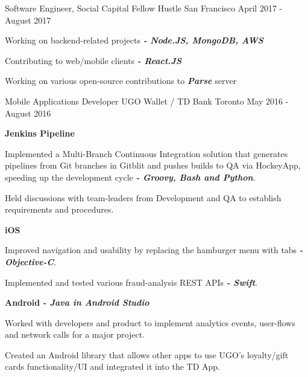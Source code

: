 \begin{cventries}
	\cventry
	{Software Engineer, Social Capital Fellow}
	{Hustle}
	{San Francisco}
	{April 2017 - August 2017}
	{
		\begin{cvitems}
			\item {Working on backend-related projects \textbf{\textit{ - Node.JS, MongoDB, AWS}}}
			\item {Contributing to web/mobile clients \textbf{\textit{  - React.JS}}}
			\item {Working on various open-source contributions to \textbf{\textit{Parse}} server}
		\end{cvitems}
	}
  \cventry
    {Mobile Applications Developer}
    {UGO Wallet / TD Bank}
    {Toronto}
    {May 2016 - August 2016}
    {
      \begin{cvitems}
        \item[]{\vspace{0.08cm}\textbf {Jenkins Pipeline}}
        \item {\vspace{0.08cm}Implemented a Multi-Branch Continuous Integration solution that generates pipelines from Git branches in Gitblit and pushes builds to QA via HockeyApp, speeding up the development cycle \textbf{\textit{ - Groovy, Bash and Python}}.}
        \item {Held discussions with team-leaders from Development and QA to establish requirements and procedures.\vspace{0.08cm}}
        \item[]{\textbf {iOS}}
        \item {\vspace{0.08cm}Improved navigation and usability by replacing the hamburger menu with tabs \textit{\textbf{ - Objective-C}}.}
        \item {Implemented and tested various fraud-analysis REST APIs \textit{\textbf{ - Swift}}.\vspace{0.08cm}}
        \item[]{\textbf {Android} \textit{\textbf { - Java in Android Studio}}}
        \item {\vspace{0.08cm}Worked with developers and product to implement analytics events, user-flows and network calls for a major project.\vspace{0.00cm}}
        \item {Created an Android library that allows other apps to use UGO's loyalty/gift cards functionality/UI and integrated it into the TD App.}

\end{cvitems}}
\end{cventries}
